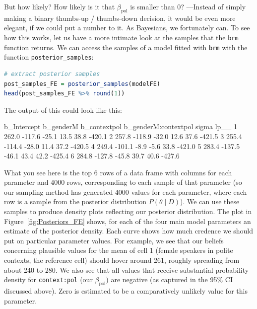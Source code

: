 \documentclass[nobib]{tufte-handout}
\begin{document}
But how likely? How likely is it that $\beta_{\text{pol}}$ is smaller than 0? ---Instead of simply making a binary thumbs-up / thumbs-down decision, it would be even more elegant, if we could put a number to it. As Bayesians, we fortunately can. To see how this works, let us have a more intimate look at the samples that the \texttt{brm} function returns. We can access the samples of a model fitted with \texttt{brm} with the function \texttt{posterior\_samples}:

\bigskip

\begin{minipage}[]{\textwidth}
\begin{lstlisting}[language=R]
# extract posterior samples 
post_samples_FE = posterior_samples(modelFE)
head(post_samples_FE %>% round(1))
\end{lstlisting}
\end{minipage}

The output of this could look like this:

\bigskip

\begin{minipage}[]{1.2\textwidth}
\begin{rc}
  b_Intercept b_genderM b_contextpol b_genderM:contextpol sigma   lp__
1       262.0    -117.6        -25.1                 13.5  38.8 -420.1
2       257.8    -118.9        -32.0                 12.6  37.6 -421.5
3       255.4    -114.4        -28.0                 11.4  37.2 -420.5
4       249.4    -101.1         -8.9                 -5.6  33.8 -421.0
5       283.4    -137.5        -46.1                 43.4  42.2 -425.4
6       284.8    -127.8        -45.8                 39.7  40.6 -427.6
\end{rc}
\end{minipage}

What you see here is the top 6 rows of a data frame with columns for each parameter and 4000 rows, corresponding to each sample of that parameter (so our sampling method has generated 4000 values for each parameter, where each row is a sample from the posterior distribution $P(\theta \mid D)$).
%
%
We can use these samples to produce density plots reflecting our posterior distribution. The plot in Figure~\ref{fig:Posteriors_FE}
shows, for each of the four main model parameters an estimate of the posterior density. Each
curve shows how much credence we should put on particular parameter values. For example, we see
that our beliefs concerning plausible values for the mean of cell 1 (female speakers in polite
contexts, the reference cell) should hover around 261, roughly spreading from about 240 to 280. We also see that all values that receive substantial probability density for \texttt{context:pol} (our $\beta_{\text{pol}}$) are negative (as captured in the 95\% CI discussed above). Zero is estimated to be a comparatively unlikely value for this parameter.
\end{document}
